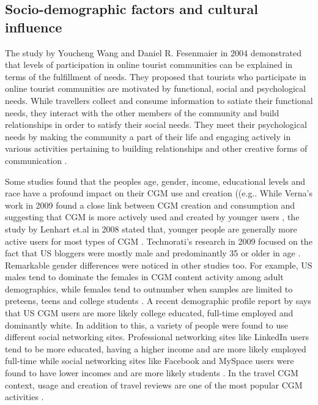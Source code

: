 \subsection{Socio-demographic factors and cultural influence}

 

The study by Youcheng Wang and Daniel R. Fesenmaier in 2004 demonstrated that levels of participation in online tourist communities can be explained in terms of the fulfillment of needs. They proposed that tourists who participate in online tourist communities are motivated by functional, social and psychological needs. While travellers collect and consume information to satiate their functional needs, they interact with the other members of the community and build relationships in order to satisfy their social needs. They meet their psychological needs by making the community a part of their life and engaging actively in various activities pertaining to building relationships and other creative forms of communication \cite{wang2002defining}.

Some studies found that the people\textquotesingle s age, gender, income, educational levels and race have a profound impact on their CGM use and creation ((e.g.\cite{lenhart2008teens}\cite{verna2009user}. While Verna's work in 2009 found a close link between CGM creation and consumption and suggesting that CGM is more actively used and created by younger users \cite{verna2009user}, the study by Lenhart et.al in 2008 stated that, younger people are generally more active users for most types of CGM \cite{lenhart2008teens}.  Technorati's research in 2009 focused on the fact that US bloggers were mostly male and predominantly 35 or older in age \cite{Technorati, 2008}. Remarkable gender differences were noticed in other studies too. For example, US males tend to dominate the females in CGM content activity among adult demographics, while females tend to outnumber when samples are limited to preteens, teens and college students \cite{verna2009user}. A recent demographic profile report by \cite{eMarketer, 2009} says that US CGM users are more likely college educated, full-time employed and dominantly white. In addition to this, a variety of people were found to use different social networking sites. Professional networking sites like LinkedIn users tend to be more educated, having a higher income and are more likely employed full-time while social networking sites like Facebook and MySpace users were found to have lower incomes and are more likely students \cite{eMarketer, 2009}. In the travel CGM context, usage and creation of travel reviews are one of the most popular CGM activities \cite{gretzel2007online}.
 

